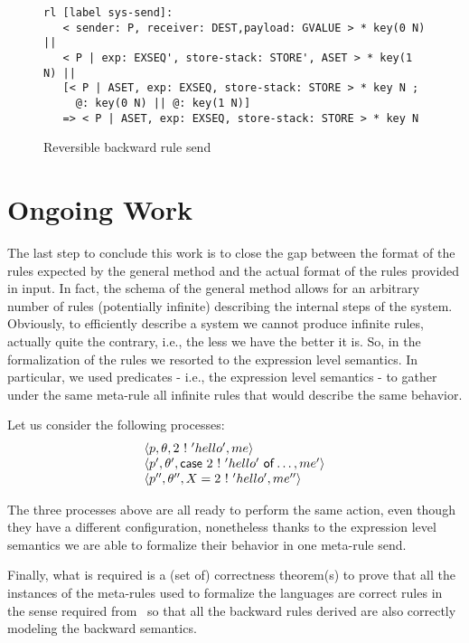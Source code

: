 \documentclass{article}[12pt,a4paper]
\theoremstyle{definition}
\begin{document}
\begin{figure}[t]
  \centering
\begin{verbatim}
rl [label sys-send]:
   < sender: P, receiver: DEST,payload: GVALUE > * key(0 N) || 
   < P | exp: EXSEQ', store-stack: STORE', ASET > * key(1 N) || 
   [< P | ASET, exp: EXSEQ, store-stack: STORE > * key N ;
     @: key(0 N) || @: key(1 N)]
   => < P | ASET, exp: EXSEQ, store-stack: STORE > * key N 
\end{verbatim}
  
  \caption{Reversible backward rule send}
  \label{fig:revsend}
\end{figure}


\section{Ongoing Work}\label{sec:ongoing-work}

The last step to conclude this work is to close the gap between the format of
the rules expected by the general method and the actual format of the rules
provided in input. In fact, the schema of the general method allows for an
arbitrary number of rules (potentially infinite) describing the internal steps
of the system. Obviously, to efficiently describe a system we cannot produce
infinite rules, actually quite the contrary, i.e., the less we have the better
it is. So, in the formalization of the rules we resorted to the expression level
semantics. In particular, we used predicates - i.e., the expression level semantics - to gather
under the same meta-rule all infinite rules that would describe the same
behavior.

Let us consider the following processes:
\[
  \begin{array}{l}
  \langle p, \theta, 2~\mathsf{!}~'hello', me\rangle\\
  \langle p', \theta', \mathsf{case}~2~\mathsf{!}~'hello'~\mathsf{of} \ldots, me'\rangle\\
  \langle p'', \theta'', X = 2~\mathsf{!}~'hello', me''\rangle 
  \end{array}
\]

The three processes above are all ready to perform the same action, even though
they have a different configuration, nonetheless thanks to the expression level
semantics we are able to formalize their behavior in one meta-rule send.

Finally, what is required is a (set of) correctness theorem(s) to prove that all
the instances of the meta-rules used to formalize the languages are correct
rules in the sense required from~\cite{LaneseM20} so that all the backward rules
derived are also correctly modeling the backward semantics.
\end{document}

